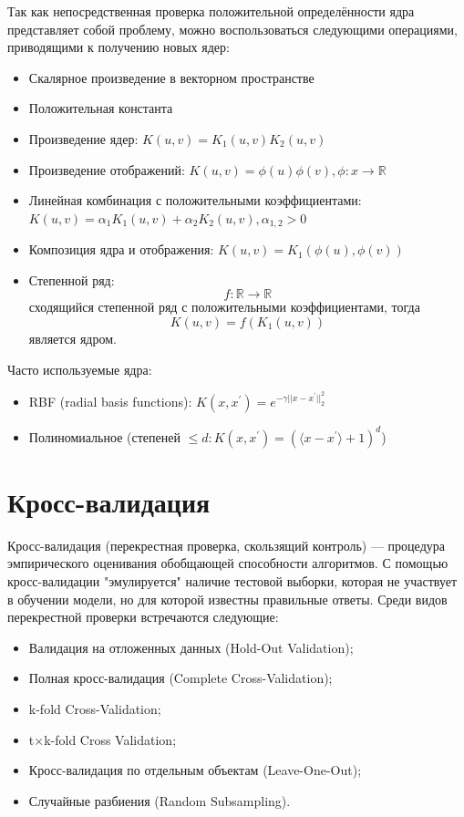 \documentclass[11pt, oneside]{article}   	%
\begin{document}
	Так как непосредственная проверка положительной определённости ядра представляет собой проблему, можно воспользоваться следующими операциями, приводящими к получению новых ядер:
	
	\begin{itemize}
		\item Скалярное произведение в векторном пространстве
		\item Положительная константа
		\item Произведение ядер: $K(u, v) = K_1(u, v) K_2(u, v)$
		\item Произведение отображений: $K(u, v) = \phi(u)\phi(v), \phi: x \rightarrow \mathbb{R}$
		\item Линейная комбинация с положительными коэффициентами: $K(u, v) = \alpha_1 K_1(u, v) + \alpha_2 K_2(u, v), \alpha_{1,2} > 0$
		\item Композиция ядра и отображения: $K(u, v) =  K_1(\phi(u), \phi(v))$
		\item Степенной ряд: $$ f: \mathbb{R} \rightarrow \mathbb{R}$$ сходящийся степенной ряд с положительными коэффициентами, тогда $$ K(u, v) = f(K_1(u, v)) $$ является ядром.
	\end{itemize} 
	
	
	Часто используемые ядра:
	\begin{itemize}
		\item RBF (radial basis functions): $K(x, x^{'}) = e^{-\gamma ||x - x^{'}||_2^2}$
		\item Полиномиальное (степеней $\leqslant d : K(x, x^{'}) = (\langle x - x^{'} \rangle + 1)^d$)
	\end{itemize} 


\section{Кросс-валидация}
Кросс-валидация (перекрестная проверка, скользящий контроль) --- процедура эмпирического оценивания обобщающей способности алгоритмов. С помощью кросс-валидации "эмулируется" наличие тестовой выборки, которая не участвует в обучении модели, но для которой известны правильные ответы. Среди видов перекрестной проверки встречаются следующие:
\begin{itemize}
	\item Валидация на отложенных данных (Hold-Out Validation);
	\item Полная кросс-валидация (Complete Cross-Validation);
	\item k-fold Cross-Validation;
	\item t$\times$k-fold Cross Validation;
	\item Кросс-валидация по отдельным объектам (Leave-One-Out);
	\item Случайные разбиения (Random Subsampling).
\end{itemize}
\end{document}
